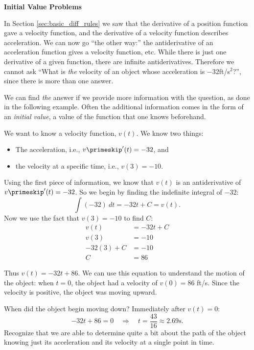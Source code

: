 
\noindent\textbf{\large Initial Value Problems}

In Section \ref{sec:basic_diff_rules} we saw that the derivative of a position function gave a velocity function, and the derivative of a velocity function describes  acceleration. We can now go ``the other way:'' the antiderivative of an acceleration function gives a velocity function, etc. While there is just one derivative of a given function, there are infinite antiderivatives. Therefore we cannot ask ``What is \textit{the} velocity of an object whose acceleration is $-32$ft/s$^2$?'', since there is more than one answer. 

We can find \textit{the} answer if we provide more information with the question, as done in the following example. Often the additional information comes in the form of an \textit{initial value}, a value of the function that one knows beforehand.\\

{We want to know a velocity function, $v(t)$. We know two things:
	\begin{itemize}
		\item		The acceleration, i.e., $v\primeskip'(t)= -32$, and
		\item		the velocity at a specific time, i.e., $v(3) = -10$.
	\end{itemize}
Using the first piece of information, we know that $v(t)$ is an antiderivative of $v\primeskip'(t)=-32$. So we begin by finding the indefinite integral of $-32$:
		$$\int (-32)\ dt = -32t+C=v(t).$$
Now we use the fact that $v(3)=-10$ to find $C$:
\begin{align*}
	v(t) &= -32t+C \\
	v(3) &= -10 \\
	-32(3)+C &= -10\\
	C &= 86
\end{align*}

Thus $v(t)= -32t+86$. We can use this equation to understand the motion of the object: when $t=0$, the object had a velocity of $v(0) = 86$ ft/s. Since the velocity is positive, the object was moving upward.

When did the object begin moving down? Immediately after $v(t) = 0$:
$$-32t+86 = 0 \quad \Rightarrow\quad  t = \frac{43}{16}  \approx 2.69\text{s}.$$
Recognize that we are able to determine quite a bit about the path of the object knowing just its acceleration and its velocity at a single point in time.
}\\

